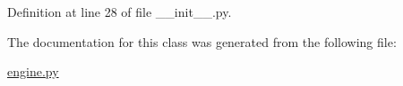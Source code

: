 \-Definition at line 28 of file \-\_\-\-\_\-init\-\_\-\-\_\-.\-py.



\-The documentation for this class was generated from the following file\-:\begin{DoxyCompactItemize}
\item 
\hyperlink{engine_8py}{engine.\-py}\end{DoxyCompactItemize}
